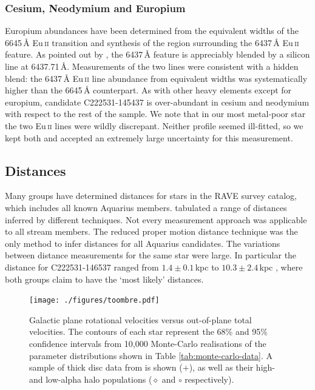 \documentclass{emulateapj}
\begin{document}

\subsubsection{Cesium, Neodymium and Europium}
Europium abundances have been determined from the equivalent widths of the 6645\,{\AA} Eu\,\textsc{ii} transition and synthesis of the region surrounding the 6437\,{\AA} Eu\,\textsc{ii} feature. As pointed out by \citet{Lawler;et-al_2001}, the 6437\,{\AA} feature is appreciably blended by a silicon line at 6437.71\,{\AA}. Measurements of the two lines were consistent with a hidden blend: the 6437\,{\AA} Eu\,\textsc{ii} line abundance from equivalent widths was systematically higher than the 6645\,{\AA} counterpart. As with other heavy elements except for europium, candidate C222531-145437 is over-abundant in cesium and neodymium with respect to the rest of the sample. We note that in our most metal-poor star the two Eu\,\textsc{ii} lines were wildly discrepant. Neither profile seemed ill-fitted, so we kept both and accepted an extremely large uncertainty for this measurement.






\subsection{Distances}
\label{sec:distances}

Many groups have determined distances for stars in the RAVE survey catalog, which includes all known Aquarius members. \citet{williams;et-al_2011} tabulated a range of distances inferred by different techniques. Not every measurement approach was applicable to all stream members. The reduced proper motion distance technique was the only method to infer distances for all Aquarius candidates. The variations between distance measurements for the same star were large. In particular the distance for {C222531-146537} ranged from $1.4 \pm 0.1$\,kpc \citep{burnett_binney_2010} to $10.3 \pm 2.4$\,kpc \citep{breddels;et-al_2010}, where both groups claim to have the `most likely' distances.

\begin{figure}[h]
	\texttt{[image: ./figures/toombre.pdf]}
	\caption{Galactic plane rotational velocities versus out-of-plane total velocities. The contours of each star represent the 68\% and 95\% confidence intervals from 10,000 Monte-Carlo realisations of the parameter distributions shown in Table \ref{tab:monte-carlo-data}. A sample of thick disc data from \citet{nissen;schuster_2010} is shown ($+$), as well as their high- and low-alpha halo populations ($\diamond$ and $\circ$ respectively).}
	\label{fig:toombre}
\end{figure}
\end{document}
